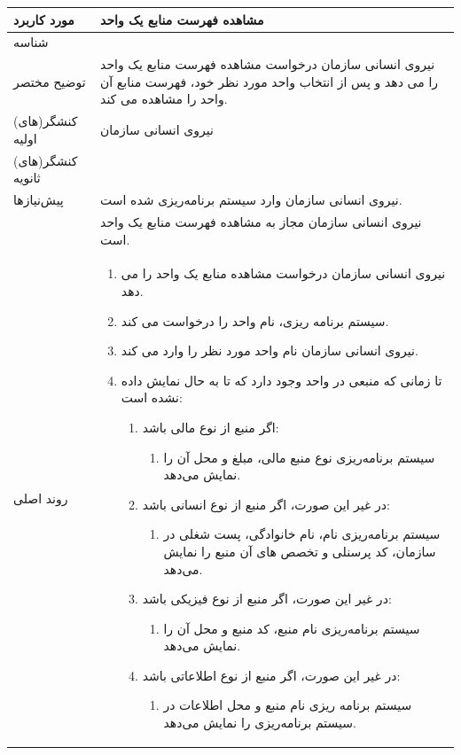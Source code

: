 \begin{table}[H]
	\centering
	\begin{tabular}{|p{3cm}|p{10cm}|}
		\hline
		مورد کاربرد & مشاهده فهرست منابع یک واحد  \\
		\hline
		شناسه & 
		\stepcounter{usecase_ID}
		\arabic{usecase_ID} \\
		\hline
		توضیح مختصر & نیروی انسانی سازمان درخواست مشاهده فهرست منابع یک واحد را می دهد و پس از انتخاب واحد مورد نظر خود، فهرست منابع آن واحد را مشاهده می کند.\\
		\hline
		کنشگر(های) اولیه & نیروی انسانی سازمان \\
		\hline
		کنشگر(های) ثانویه &  \\
		\hline
		پیش‌نیازها & نیروی انسانی سازمان وارد سیستم برنامه‌ریزی شده است. \\
		& نیروی انسانی سازمان مجاز به مشاهده فهرست منابع یک واحد است. \\
		\hline
		
		روند اصلی &
		\begin{enumerate}[topsep=0cm,leftmargin=0.5cm]
			\item نیروی انسانی سازمان درخواست مشاهده منابع یک واحد را می دهد.
			\item سیستم برنامه ریزی، نام واحد را درخواست می کند.
			\item نیروی انسانی سازمان نام واحد مورد نظر را وارد می کند. 
			\item تا زمانی که منبعی در واحد وجود دارد که تا به حال نمایش داده نشده است:
			\begin{enumerate}[topsep=0cm,leftmargin=0.5cm]
				\item اگر منبع از نوع مالی باشد:
				\begin{enumerate}[topsep=0cm,leftmargin=0.5cm]
					\item سیستم برنامه‌ریزی نوع منبع مالی، مبلغ و محل آن را نمایش می‌دهد.
				\end{enumerate}
				\item در غیر این صورت، اگر منبع از نوع انسانی باشد:
				\begin{enumerate}[topsep=0cm,leftmargin=0.5cm]
					\item سیستم برنامه‌ریزی نام، نام خانوادگی، پست شغلی در سازمان، کد پرسنلی و تخصص های آن منبع را نمایش می‌دهد.
				\end{enumerate}
				\item در غیر این صورت، اگر منبع از نوع فیزیکی باشد:
				\begin{enumerate}[topsep=0cm,leftmargin=0.5cm]
					\item سیستم برنامه‌ریزی نام منبع، کد منبع و محل آن را نمایش می‌دهد.
				\end{enumerate}
				\item در غیر این صورت، اگر منبع از نوع اطلاعاتی باشد:
				\begin{enumerate}[topsep=0cm,leftmargin=0.5cm]
					\item سیستم برنامه ریزی نام منبع و محل اطلاعات در سیستم برنامه‌ریزی را نمایش می‌دهد. 
				\end{enumerate}	
			\end{enumerate}
		\end{enumerate} \\
		

\end{tabular}
\end{table}
